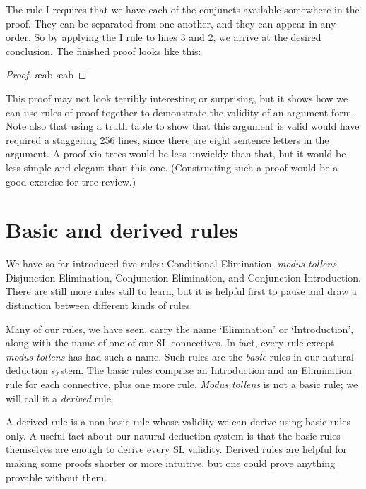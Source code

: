 The rule {\eand}I requires that we have each of the conjuncts available somewhere in the proof. They can be separated from one another, and they can appear in any order. So by applying the {\eand}I rule to lines 3 and 2, we arrive at the desired conclusion. The finished proof looks like this:

\begin{proof}

	 \ae{ab}
	 \ae{ab}
	 
\end{proof}

This proof may not look terribly interesting or surprising, but it shows how we can use rules of proof together to demonstrate the validity of an argument form. Note also that using a truth table to show that this argument is valid would have required a staggering 256 lines, since there are eight sentence letters in the argument. A proof via trees would be less unwieldy than that, but it would be less simple and elegant than this one. (Constructing such a proof would be a good exercise for tree review.)


\section{Basic and derived rules}
\label{sec:basic}

We have so far introduced five rules: Conditional Elimination, \emph{modus tollens}, Disjunction Elimination, Conjunction Elimination, and Conjunction Introduction. There are still more rules still to learn, but it is helpful first to pause and draw a distinction between different kinds of rules.

Many of our rules, we have seen, carry the name `Elimination' or `Introduction', along with the name of one of our SL connectives. In fact, every rule except \emph{modus tollens} has had such a name. Such rules are the \emph{basic} rules in our natural deduction system. The basic rules comprise an Introduction and an Elimination rule for each connective, plus one more rule. \emph{Modus tollens} is not a basic rule; we will call it a \emph{derived} rule.

A derived rule is a non-basic rule whose validity we can derive using basic rules only. A useful fact about our natural deduction system is that the basic rules themselves are enough to derive every SL validity. Derived rules are helpful for making some proofs shorter or more intuitive, but one could prove anything provable without them.

